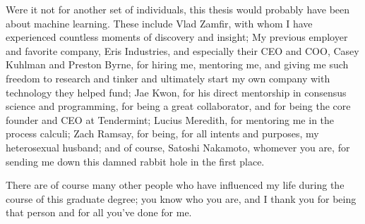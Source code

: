 Were it not for another set of individuals, this thesis would probably have been about machine learning.
These include Vlad Zamfir, with whom I have experienced countless moments of discovery and insight;
My previous employer and favorite company, Eris Industries, and especially their CEO and COO, Casey Kuhlman and Preston Byrne,
for hiring me, mentoring me, and giving me such freedom to research and tinker and ultimately start my own company with technology they helped fund;
Jae Kwon, for his direct mentorship in consensus science and programming, for being a great collaborator, and for being the core founder and CEO at Tendermint;
Lucius Meredith, for mentoring me in the process calculi;
Zach Ramsay, for being, for all intents and purposes, my heterosexual husband;
and of course, Satoshi Nakamoto, whomever you are, for sending me down this damned rabbit hole in the first place.

There are of course many other people who have influenced my life during the course of this graduate degree;
you know who you are, and I thank you for being that person and for all you've done for me.

\tableofcontents
\listoffigures
\listoftables
{}

